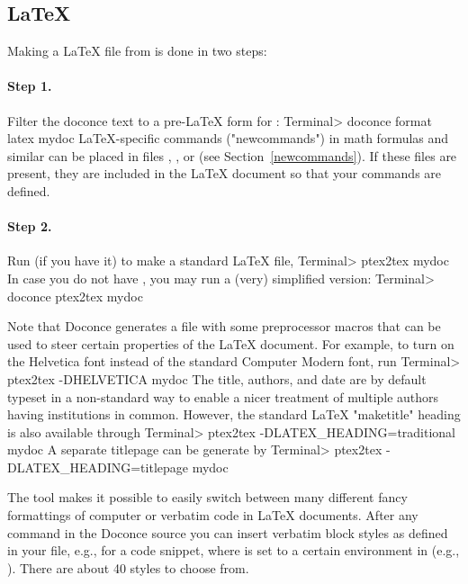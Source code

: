 \documentclass{book}
\begin{document}
\subsection{{\LaTeX}}

Making a {\LaTeX} file  from  is done in two steps:

\paragraph{Step 1.}
Filter the doconce text to a pre-LaTeX form  for
     :
\bsys
Terminal> doconce format latex mydoc
\esys
LaTeX-specific commands ("newcommands") in math formulas and similar
can be placed in files , , or
 (see Section~\ref{newcommands}).
If these files are present, they are included in the {\LaTeX} document
so that your commands are defined.

\paragraph{Step 2.}
Run  (if you have it) to make a standard {\LaTeX} file,
\bsys
Terminal> ptex2tex mydoc
\esys
In case you do not have , you may run a (very) simplified version:
\bsys
Terminal> doconce ptex2tex mydoc
\esys

Note that Doconce generates a  file with some preprocessor macros
that can be used to steer certain properties of the {\LaTeX} document.
For example, to turn on the Helvetica font instead of the standard
Computer Modern font, run
\bsys
Terminal> ptex2tex -DHELVETICA mydoc
\esys
The title, authors, and date are by default typeset in a non-standard
way to enable a nicer treatment of multiple authors having
institutions in common. However, the standard {\LaTeX} "maketitle" heading
is also available through
\bsys
Terminal> ptex2tex -DLATEX_HEADING=traditional mydoc
\esys
A separate titlepage can be generate by
\bsys
Terminal> ptex2tex -DLATEX_HEADING=titlepage mydoc
\esys

The  tool makes it possible to easily switch between many
different fancy formattings of computer or verbatim code in {\LaTeX}
documents. After any  command in the Doconce source you can
insert verbatim block styles as defined in your 
file, e.g.,  for a code snippet, where  is set to
a certain environment in  (e.g., ).
There are about 40 styles to choose from.
\end{document}
